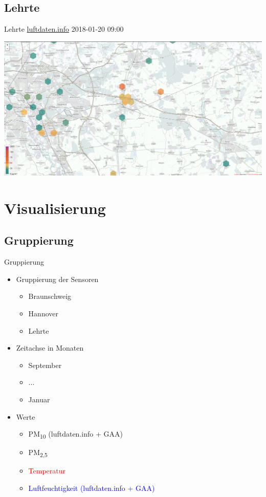 \documentclass[aspectratio=169]{beamer} %
\begin{document}
\subsection{Lehrte}
\begin{frame}{Lehrte \href{http://hannover.maps.luftdaten.info/\#12/52.373/10.005}{luftdaten.info} 2018-01-20 09:00}
  \begin{center}
    \includegraphics[width=\textwidth]{../screenshots/luftdaten-zoom-a.png}
  \end{center}
\end{frame}

\section{Visualisierung}
\subsection{Gruppierung}
\begin{frame}{Gruppierung}
  \begin{itemize}
  \item Gruppierung der Sensoren
    \begin{itemize}
    \item Braunschweig
    \item Hannover
    \item Lehrte
    \end{itemize}
  \item Zeitachse in Monaten
    \begin{itemize}
    \item September
    \item ...
    \item Januar
    \end{itemize}
  \item Werte
    \begin{itemize}
    \item PM\textsubscript{10} (luftdaten.info + GAA)
    \item PM\textsubscript{2,5}
    \item \textcolor{red}{Temperatur}
    \item \textcolor{blue}{Luftfeuchtigkeit (luftdaten.info + GAA)}
    \end{itemize}
  \end{itemize}
\end{frame}
\end{document}
